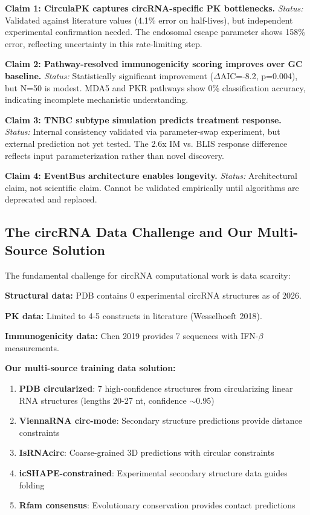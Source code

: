 \documentclass[12pt]{article}
\begin{document}
\textbf{Claim 1: CirculaPK captures circRNA-specific PK bottlenecks.}
\textit{Status:} Validated against literature values (4.1\% error on half-lives), but independent experimental confirmation needed. The endosomal escape parameter shows 158\% error, reflecting uncertainty in this rate-limiting step.

\textbf{Claim 2: Pathway-resolved immunogenicity scoring improves over GC baseline.}
\textit{Status:} Statistically significant improvement ($\Delta$AIC=-8.2, p=0.004), but N=50 is modest. MDA5 and PKR pathways show 0\% classification accuracy, indicating incomplete mechanistic understanding.

\textbf{Claim 3: TNBC subtype simulation predicts treatment response.}
\textit{Status:} Internal consistency validated via parameter-swap experiment, but external prediction not yet tested. The 2.6x IM vs. BLIS response difference reflects input parameterization rather than novel discovery.

\textbf{Claim 4: EventBus architecture enables longevity.}
\textit{Status:} Architectural claim, not scientific claim. Cannot be validated empirically until algorithms are deprecated and replaced.

\subsection{The circRNA Data Challenge and Our Multi-Source Solution}

The fundamental challenge for circRNA computational work is data scarcity:

\textbf{Structural data:} PDB contains 0 experimental circRNA structures as of 2026.

\textbf{PK data:} Limited to 4-5 constructs in literature (Wesselhoeft 2018).

\textbf{Immunogenicity data:} Chen 2019 provides 7 sequences with IFN-$\beta$ measurements.

\textbf{Our multi-source training data solution:}

\begin{enumerate}
\item \textbf{PDB circularized}: 7 high-confidence structures from circularizing linear RNA structures (lengths 20-27 nt, confidence $\sim$0.95)

\item \textbf{ViennaRNA circ-mode}: Secondary structure predictions provide distance constraints

\item \textbf{IsRNAcirc}: Coarse-grained 3D predictions with circular constraints

\item \textbf{icSHAPE-constrained}: Experimental secondary structure data guides folding

\item \textbf{Rfam consensus}: Evolutionary conservation provides contact predictions
\end{enumerate}
\end{document}

